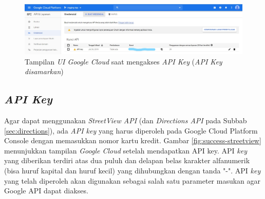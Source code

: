 \begin{figure}[h]
	\centering
		\includegraphics[width=6in]{Gambar/google_cloud.png}
	\caption{Tampilan \textit{UI Google Cloud} saat mengakses \textit{API Key} (\textit{API Key disamarkan})}
	\label{fig:googlecloud}
\end{figure}

\subsection{{\it API Key}}
\label{subs:api-key}
Agar dapat menggunakan {\it StreetView API} (dan \textit{Directions API} pada Subbab \ref{sec:directions}), ada {\it API key} yang harus diperoleh pada Google Cloud Platform Console dengan memasukkan nomor kartu kredit. Gambar \ref{fig:success-streetview} menunjukkan tampilan \textit{Google Cloud} setelah mendapatkan API key. API {\it key} yang diberikan terdiri atas dua puluh dan delapan belas karakter alfanumerik (bisa huruf kapital dan huruf kecil) yang dihubungkan dengan tanda "-". API {\it key} yang telah diperoleh akan digunakan sebagai salah satu parameter masukan agar Google API dapat diakses.


